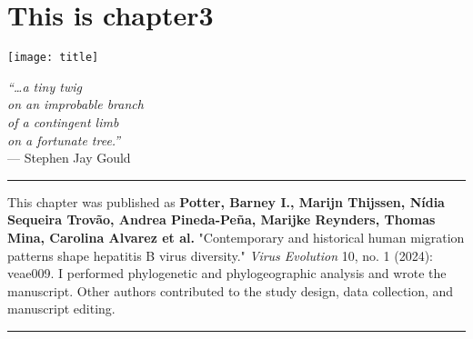 \chapter{This is chapter3}\label{ch:chapter3}

\begin{minipage}[b]{0.6\textwidth}
    \texttt{[image: title]} %
  \end{minipage}
  \hfill
  \begin{minipage}[b]{0.35\textwidth}
    \footnotesize
    \begin{flushright}
      \textit{``\ldots a tiny twig\\on an improbable branch\\of a contingent limb\\on a fortunate tree.''} \\
      --- Stephen Jay Gould
    \end{flushright}
    \vspace{2cm}
  \end{minipage}

\clearpage

\hrule
\vspace*{12pt}
This chapter was published as \textbf{Potter, Barney I., Marijn Thijssen, Nídia Sequeira Trovão, Andrea Pineda-Peña, Marijke Reynders, Thomas Mina, Carolina Alvarez et al.} "Contemporary and historical human migration patterns shape hepatitis B virus diversity." \textit{Virus Evolution} 10, no. 1 (2024): veae009. I performed phylogenetic and phylogeographic analysis and wrote the manuscript. Other authors contributed to the study design, data collection, and manuscript editing.
\vspace*{12pt}
\hrule

